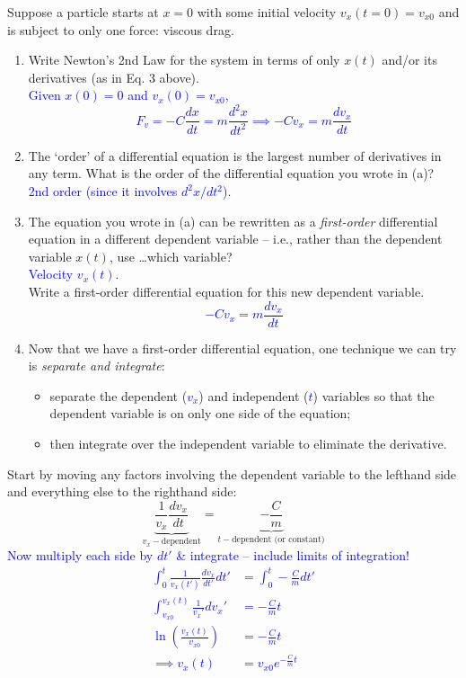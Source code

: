 \documentclass[11pt, letterpaper, openany]{book}
\newenvironment{exercise}[1][Exercise]{%
  \tcolorbox[blanker, breakable, left=1em,
    before skip=1em, after skip=1em,
    borderline west={3pt}{0pt}{PhysNavy},
    colback=PhysCream,
    before upper={\textcolor{PhysNavy}{\sffamily\bfseries #1:}\space}
  ]%
}{%
  \endtcolorbox%
}
\begin{document}
\begin{exercise}[Exercise 1]
Suppose a particle starts at $x = 0$ with some initial velocity $v_x(t = 0) = v_{x0}$ and is subject to only one force: viscous drag.
\begin{enumerate}[label=(\alph*)]
    \item Write Newton's 2nd Law for the system in terms of only $x(t)$ and/or its derivatives (as in Eq. 3 above). \\
    \textcolor{blue}{
    Given $x(0) = 0$ and $v_x(0) = v_{x0}$,
    \[ F_v = -C\frac{dx}{dt} = m\frac{d^2x}{dt^2} \implies -Cv_x = m\frac{dv_x}{dt} \]
    }
    \item The `order' of a differential equation is the largest number of derivatives in any term. What is the order of the differential equation you wrote in (a)? \\
    \textcolor{blue}{2nd order (since it involves $d^2x/dt^2$).}
    \item The equation you wrote in (a) can be rewritten as a \textit{first-order} differential equation in a different dependent variable -- i.e., rather than the dependent variable $x(t)$, use \dots which variable? \\
    \textcolor{blue}{Velocity $v_x(t)$.} \\
    Write a first-order differential equation for this new dependent variable. \\
    \textcolor{blue}{
    \[ -C v_x = m\frac{dv_x}{dt} \]
    }
    \item Now that we have a first-order differential equation, one technique we can try is \textit{separate and integrate}:
    \begin{itemize}
        \item separate the dependent (\textcolor{blue}{$v_x$}) and independent (\textcolor{blue}{$t$}) variables so that the dependent variable is on only one side of the equation;
        \item then integrate over the independent variable to eliminate the derivative.
    \end{itemize}
\end{enumerate}

Start by moving any factors involving the dependent variable to the lefthand side and everything else to the righthand side:
\[ \underbrace{\frac{1}{v_x}\frac{dv_x}{dt}}_{v_x-\text{dependent}} = \underbrace{-\frac{C}{m}}_{t-\text{dependent (or constant)}} \]
\textcolor{blue}{Now multiply each side by $dt'$ \& integrate -- include limits of integration!}
\textcolor{blue}{
\begin{align*}
    \int_{0}^{t} \frac{1}{v_x(t')} \frac{dv_x}{dt'} dt' &= \int_{0}^{t} -\frac{C}{m} dt' \\
    \int_{v_{x0}}^{v_x(t)} \frac{1}{v_x'} dv_x' &= -\frac{C}{m} t \\
    \ln\left(\frac{v_x(t)}{v_{x0}}\right) &= -\frac{C}{m} t \\
    \implies v_x(t) &= v_{x0}e^{-\frac{C}{m}t}
\end{align*}
}


\end{exercise}
\end{document}

